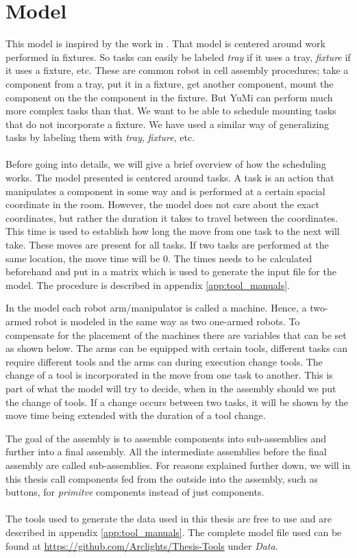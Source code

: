 \chapter{Model}\label{cha:model}

 This model is inspired by the work in \cite{ejenstam_2014}. That model is centered around work performed in fixtures. So tasks can easily be labeled \emph{tray} if it uses a tray, \emph{fixture} if it uses a fixture, etc. These are common robot in cell assembly procedures; take a component from a tray, put it in a fixture, get another component, mount the component on the the component in the fixture. But YuMi can perform much more complex tasks than that. We want to be able to schedule mounting tasks that do not incorporate a fixture. We have used a similar way of generalizing tasks by labeling them with \emph{tray}, \emph{fixture}, etc.
 \\\\
Before going into details, we will give a brief overview of how the scheduling works. The model presented is centered around tasks. A task is an action that manipulates a component in some way and is performed at a certain spacial coordinate in the room. However, the model does not care about the exact coordinates, but rather the duration it takes to travel between the coordinates. This time is used to establish how long the move from one task to the next will take. These moves are present for all tasks. If two tasks are performed at the same location, the move time will be $0$. The times needs to be calculated beforehand and put in a matrix which is used to generate the input file for the model. The procedure is described in appendix \ref{app:tool_manuals}.

In the model each robot arm/manipulator is called a machine. Hence, a two-armed robot is modeled in the same way as two one-armed robots. To compensate for the placement of the machines there are variables that can be set as shown below. The arms can be equipped with certain tools, different tasks can require different tools and the arms can during execution change tools. The change of a tool is incorporated in the move from one task to another. This is part of what the model will try to decide, when in the assembly should we put the change of tools. If a change occurs between two tasks, it will be shown by the move time being extended with the duration of a tool change.

 The goal of the assembly is to assemble components into sub-assemblies and further into a final assembly. All the intermediate assemblies before the final assembly are called sub-assemblies. For reasons explained further down, we will in this thesis call components fed from the outside into the assembly, such as buttons, for \emph{primitve} components instead of just components.
\\\\
The tools used to generate the data used in this thesis are free to use and are described in appendix \ref{app:tool_manuals}. The complete model file used can be found at \url{https://github.com/Arclights/Thesis-Tools} under \emph{Data}.
 
